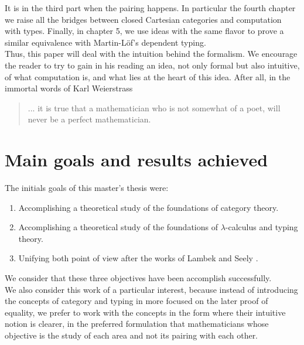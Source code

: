 It is in the third part when the pairing happens. In particular the fourth chapter we raise all the bridges between closed Cartesian categories and computation with types. Finally, in chapter 5, we use ideas with the same flavor to prove a similar equivalence with Martin-L\"of's dependent typing. \\

Thus, this paper will deal with the intuition behind the formalism. We encourage the reader to try to gain in his reading an idea, not only formal but also intuitive, of what computation is, and what lies at the heart of this idea.  After all, in the immortal words of Karl Weierstrass \cite{duporcq1902compte}

\begin{quote}
... it is true that a mathematician who is not somewhat of a poet, will never be a perfect mathematician.\\
\end{quote}

\section*{Main goals and results achieved}
The initials goals of this master's thesis were:
\begin{enumerate}
\item Accomplishing a theoretical study of the foundations of category theory.
\item Accomplishing a theoretical study of the foundations of $\lambda$-calculus and typing theory.
\item Unifying both point of view after the works of Lambek \cite{lambek1988introduction} and Seely \cite{seely1984locally}.
\end{enumerate}

We consider that these three objectives have been accomplish successfully.\\

We also consider this work of a particular interest, because instead of introducing the concepts of category and typing in more focused on the later proof of equality, we prefer to work with the concepts in the form where their intuitive notion is clearer, in the preferred formulation that mathematicians whose objective is the study of each area and not its pairing with each other.



\endinput
